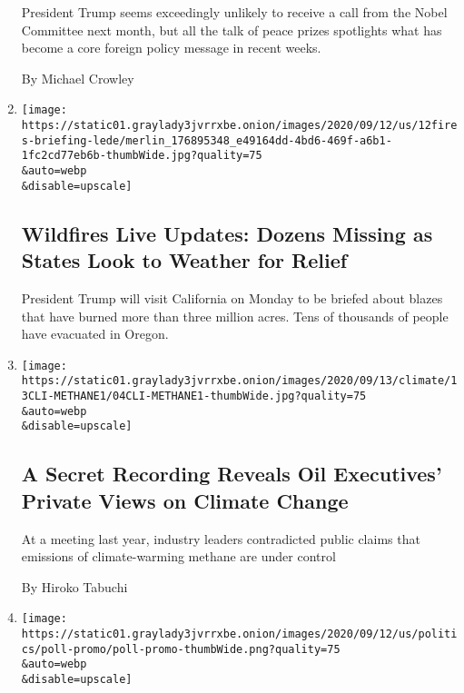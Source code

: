 \begin{enumerate}
  President Trump seems exceedingly unlikely to receive a call from the
  Nobel Committee next month, but all the talk of peace prizes
  spotlights what has become a core foreign policy message in recent
  weeks.

  By Michael Crowley
\item
  \href{/2020/09/12/us/wildfires-live-updates.html}{}

  \texttt{[image: https://static01.graylady3jvrrxbe.onion/images/2020/09/12/us/12fires-briefing-lede/merlin\_176895348\_e49164dd-4bd6-469f-a6b1-1fc2cd77eb6b-thumbWide.jpg?quality=75\\\&auto=webp\\\&disable=upscale]}

  \hypertarget{wildfires-live-updates-dozens-missing-as-states-look-to-weather-for-relief-1}{%
  \subsection{Wildfires Live Updates: Dozens Missing as States Look to
  Weather for
  Relief}\label{wildfires-live-updates-dozens-missing-as-states-look-to-weather-for-relief-1}}

  President Trump will visit California on Monday to be briefed about
  blazes that have burned more than three million acres. Tens of
  thousands of people have evacuated in Oregon.
\item
  \href{/2020/09/12/climate/methane-natural-gas-flaring.html}{}

  \texttt{[image: https://static01.graylady3jvrrxbe.onion/images/2020/09/13/climate/13CLI-METHANE1/04CLI-METHANE1-thumbWide.jpg?quality=75\\\&auto=webp\\\&disable=upscale]}

  \hypertarget{a-secret-recording-reveals-oil-executives-private-views-on-climate-change}{%
  \subsection{A Secret Recording Reveals Oil Executives' Private Views
  on Climate
  Change}\label{a-secret-recording-reveals-oil-executives-private-views-on-climate-change}}

  At a meeting last year, industry leaders contradicted public claims
  that emissions of climate-warming methane are under control

  By Hiroko Tabuchi
\item
  \href{/2020/09/12/us/politics/biden-trump-poll-wisconsin-minnesota.html}{}

  \texttt{[image: https://static01.graylady3jvrrxbe.onion/images/2020/09/12/us/politics/poll-promo/poll-promo-thumbWide.png?quality=75\\\&auto=webp\\\&disable=upscale]}


\end{enumerate}
